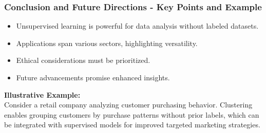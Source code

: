 \documentclass[aspectratio=169]{beamer}
\begin{document}
\begin{frame}[fragile]
    \frametitle{Conclusion and Future Directions - Key Points and Example}
    \begin{itemize}
        \item Unsupervised learning is powerful for data analysis without labeled datasets.
        \item Applications span various sectors, highlighting versatility.
        \item Ethical considerations must be prioritized.
        \item Future advancements promise enhanced insights.
    \end{itemize}
    
    \textbf{Illustrative Example:} \\
    Consider a retail company analyzing customer purchasing behavior. Clustering enables grouping customers by purchase patterns without prior labels, which can be integrated with supervised models for improved targeted marketing strategies.
\end{frame}
\end{document}
